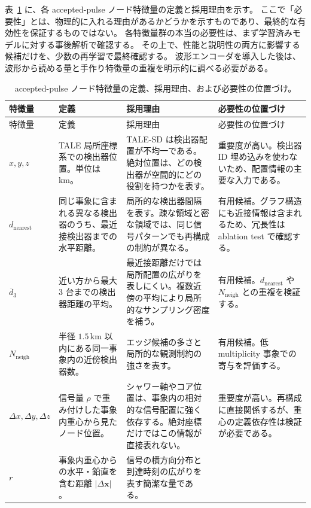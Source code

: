 \documentclass[lualatex,paper=a4,fontsize=9pt]{jlreq}
\begin{document}
表~\ref{tab:node-feature-definitions} に、各 accepted-pulse ノード特徴量の定義と採用理由を示す。
ここで「必要性」とは、物理的に入れる理由があるかどうかを示すものであり、最終的な有効性を保証するものではない。
各特徴量群の本当の必要性は、まず学習済みモデルに対する事後解析で確認する。
その上で、性能と説明性の両方に影響する候補だけを、少数の再学習で最終確認する。
波形エンコーダを導入した後は、波形から読める量と手作り特徴量の重複を明示的に調べる必要がある。

{\small
\setlength{\tabcolsep}{3pt}
\begin{longtable}{p{25mm}p{48mm}p{50mm}p{35mm}}
  \caption{accepted-pulse ノード特徴量の定義、採用理由、および必要性の位置づけ。}
  \label{tab:node-feature-definitions}\\
  \toprule
  特徴量 & 定義 & 採用理由 & 必要性の位置づけ \\
  \midrule
  \endfirsthead
  \toprule
  特徴量 & 定義 & 採用理由 & 必要性の位置づけ \\
  \midrule
  \endhead
  \bottomrule
  \endfoot
  $x,y,z$ &
  TALE 局所座標系での検出器位置。単位は km。 &
  TALE-SD は検出器配置が不均一である。絶対位置は、どの検出器が空間的にどの役割を持つかを表す。 &
  重要度が高い。検出器 ID 埋め込みを使わないため、配置情報の主要な入力である。 \\
  $d_{\mathrm{nearest}}$ &
  同じ事象に含まれる異なる検出器のうち、最近接検出器までの水平距離。 &
  局所的な検出器間隔を表す。疎な領域と密な領域では、同じ信号パターンでも再構成の制約が異なる。 &
  有用候補。グラフ構造にも近接情報は含まれるため、冗長性は ablation test で確認する。 \\
  $\overline{d}_{3}$ &
  近い方から最大 3 台までの検出器距離の平均。 &
  最近接距離だけでは局所配置の広がりを表しにくい。複数近傍の平均により局所的なサンプリング密度を補う。 &
  有用候補。$d_{\mathrm{nearest}}$ や $N_{\mathrm{neigh}}$ との重複を検証する。 \\
  $N_{\mathrm{neigh}}$ &
  半径 $1.5\,\mathrm{km}$ 以内にある同一事象内の近傍検出器数。 &
  エッジ候補の多さと局所的な観測制約の強さを表す。 &
  有用候補。低 multiplicity 事象での寄与を評価する。 \\
  $\Delta x,\Delta y,\Delta z$ &
  信号量 $\rho$ で重み付けした事象内重心から見たノード位置。 &
  シャワー軸やコア位置は、事象内の相対的な信号配置に強く依存する。絶対座標だけではこの情報が直接表れない。 &
  重要度が高い。再構成に直接関係するが、重心の定義依存性は検証が必要である。 \\
  $r$ &
  事象内重心からの水平・鉛直を含む距離 $|\Delta \mathbf{x}|$。 &
  信号の横方向分布と到達時刻の広がりを表す簡潔な量である。 &

\end{longtable}}
\end{document}

